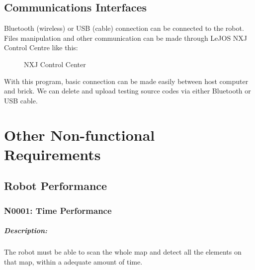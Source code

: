 \documentclass[11pt, a4paper]{report}
\begin{document}
\section{Communications Interfaces}
Bluetooth (wireless) or USB (cable) connection can be connected to the robot. 
Files manipulation and other communication can be made through LeJOS NXJ Control Centre like this: 

\begin{figure}[ht]
\centering
\setlength\fboxsep{2pt}
\setlength\fboxrule{0.2pt}
\caption{NXJ Control Center}
\label{sec:NXJCC}
\label{fig:NXJCC}
\end{figure}
With this program, basic connection can be made easily between host computer and brick. 
We can delete and upload testing source codes via either Bluetooth or USB cable.
\pagebreak



\chapter{Other Non-functional Requirements}


\section{Robot Performance}

\subsection{N0001: Time Performance}
\paragraph{Description:}
The robot must be able to scan the whole map and detect all the elements on that map, within a adequate amount of time.
\end{document}
